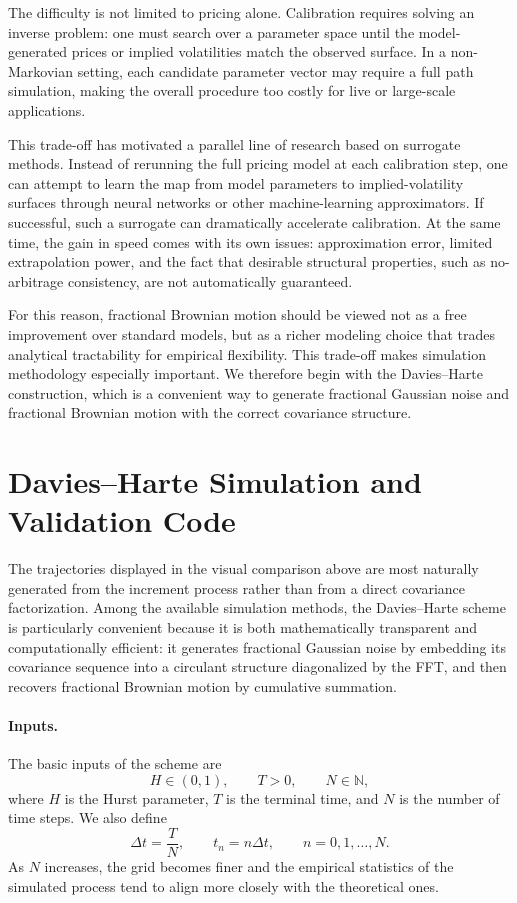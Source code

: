 \documentclass[a4paper,10pt,titlepage,oneside,openany]{book}
\theoremstyle{plain}
\theoremstyle{definition}
\theoremstyle{remark}
\newcommand{\1}{\mathbf{1}}
\begin{document}
The difficulty is not limited to pricing alone. Calibration requires solving an inverse problem: one must search over a parameter space until the model-generated prices or implied volatilities match the observed surface. In a non-Markovian setting, each candidate parameter vector may require a full path simulation, making the overall procedure too costly for live or large-scale applications.

This trade-off has motivated a parallel line of research based on surrogate methods. Instead of rerunning the full pricing model at each calibration step, one can attempt to learn the map from model parameters to implied-volatility surfaces through neural networks or other machine-learning approximators. If successful, such a surrogate can dramatically accelerate calibration. At the same time, the gain in speed comes with its own issues: approximation error, limited extrapolation power, and the fact that desirable structural properties, such as no-arbitrage consistency, are not automatically guaranteed.

For this reason, fractional Brownian motion should be viewed not as a free improvement over standard models, but as a richer modeling choice that trades analytical tractability for empirical flexibility. This trade-off makes simulation methodology especially important. We therefore begin with the Davies--Harte construction, which is a convenient way to generate fractional Gaussian noise and fractional Brownian motion with the correct covariance structure.

\section{Davies--Harte Simulation and Validation Code}

The trajectories displayed in the visual comparison above are most naturally generated from the increment process rather than from a direct covariance factorization. Among the available simulation methods, the Davies--Harte scheme is particularly convenient because it is both mathematically transparent and computationally efficient: it generates fractional Gaussian noise by embedding its covariance sequence into a circulant structure diagonalized by the FFT, and then recovers fractional Brownian motion by cumulative summation.

\paragraph{Inputs.} The basic inputs of the scheme are
\[
H\in(0,1), \qquad T>0, \qquad N\in\mathbb{N},
\]
where \(H\) is the Hurst parameter, \(T\) is the terminal time, and \(N\) is the number of time steps. We also define
\[
\Delta t = \frac{T}{N},
\qquad
t_n = n\Delta t,
\qquad n=0,1,\dots,N.
\]
As \(N\) increases, the grid becomes finer and the empirical statistics of the simulated process tend to align more closely with the theoretical ones.
\end{document}
